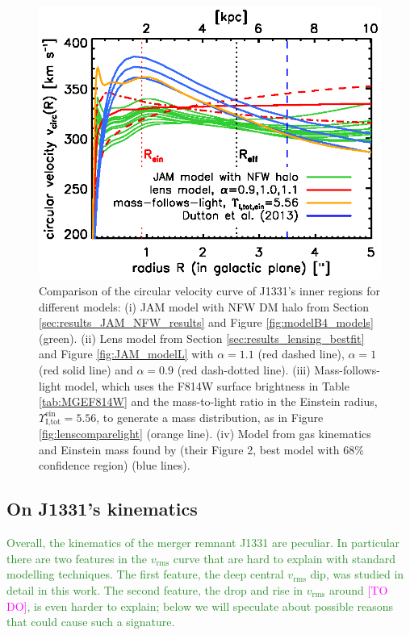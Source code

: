 \documentclass[useAMS,usenatbib]{mnras}
\newcommand{\Wilma}[1]{\textcolor{Magenta}{#1}}
\newcommand{\NEW}[1]{\textcolor{ForestGreen}{#1}}
\newcommand{\OLD}[1]{}
\begin{document}
\begin{figure}
\centering
\includegraphics[width=0.9\linewidth]{fig/B4_jam_profiles_errors_short_vcirc.ps}
\caption{Comparison of the circular velocity curve of J1331's inner regions for different models: (i) JAM model with NFW DM halo from Section \ref{sec:results_JAM_NFW_results} and Figure \ref{fig:modelB4_models} (green). (ii) Lens model from Section \ref{sec:results_lensing_bestfit} and Figure \ref{fig:JAM_modelL} with $\alpha = 1.1$ (red dashed line), $\alpha = 1$ (red solid line) and $\alpha=0.9$ (red dash-dotted line). (iii) Mass-follows-light model, which uses the F814W surface brightness in Table \ref{tab:MGEF814W} and the mass-to-light ratio in the Einstein radius, $\Upsilon^\text{ein}_\text{I,tot} = 5.56$, to generate a mass distribution, as in Figure \ref{fig:lenscomparelight} (orange line).  (iv) Model from gas kinematics and Einstein mass found by \citet{SWELLSV} (their Figure 2, best model with 68\% confidence region) (blue lines).}
\label{fig:vcirc_comparison}
\end{figure}

\subsection{On J1331's \OLD{central }kinematics}

\NEW{Overall, the kinematics of the merger remnant J1331 are peculiar. In particular there are two features in the $v_\text{rms}$ curve that are hard to explain with standard modelling techniques. The first feature, the deep central $v_\text{rms}$ dip, was studied in detail in this work. The second feature, the drop and rise in $v_\text{rms}$ around \Wilma{[TO DO]}, is even harder to explain; below we will speculate about possible reasons that could cause such a signature.}
\end{document}
